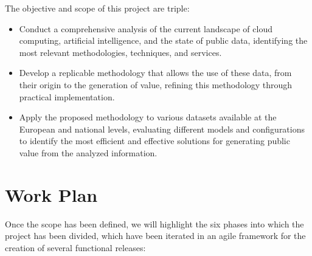 The objective and scope of this project are triple:
\begin{itemize}
	\item Conduct a comprehensive analysis of the current landscape of cloud computing, artificial intelligence, and the state of public data, identifying the most relevant methodologies, techniques, and services.
	
	\item Develop a replicable methodology that allows the use of these data, from their origin to the generation of value, refining this methodology through practical implementation.
	
	\item Apply the proposed methodology to various datasets available at the European and national levels, evaluating different models and configurations to identify the most efficient and effective solutions for generating public value from the analyzed information.
	
	
\end{itemize}

\section{Work Plan}

Once the scope has been defined, we will highlight the six phases into which the project has been divided, which have been iterated in an agile framework for the creation of several functional releases:


